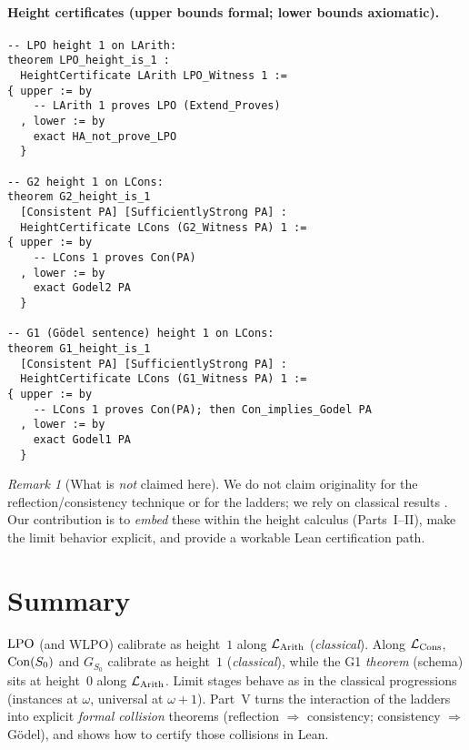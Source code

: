 \documentclass[11pt]{article}
\theoremstyle{definition}
\theoremstyle{remark}
\newtheorem{remark}[theorem]{Remark}
\newcommand{\WLPO}{\mathrm{WLPO}}
\begin{document}
\paragraph{Height certificates (upper bounds formal; lower bounds axiomatic).}
\begin{verbatim}
-- LPO height 1 on LArith:
theorem LPO_height_is_1 :
  HeightCertificate LArith LPO_Witness 1 :=
{ upper := by
    -- LArith 1 proves LPO (Extend_Proves)
  , lower := by
    exact HA_not_prove_LPO
  }

-- G2 height 1 on LCons:
theorem G2_height_is_1
  [Consistent PA] [SufficientlyStrong PA] :
  HeightCertificate LCons (G2_Witness PA) 1 :=
{ upper := by
    -- LCons 1 proves Con(PA)
  , lower := by
    exact Godel2 PA
  }

-- G1 (Gödel sentence) height 1 on LCons:
theorem G1_height_is_1
  [Consistent PA] [SufficientlyStrong PA] :
  HeightCertificate LCons (G1_Witness PA) 1 :=
{ upper := by
    -- LCons 1 proves Con(PA); then Con_implies_Godel PA
  , lower := by
    exact Godel1 PA
  }
\end{verbatim}

\begin{remark}[What is \emph{not} claimed here]
We do not claim originality for the reflection/consistency technique or for the ladders;
we rely on classical results \cite{Turing1939,Feferman1962,HajekPudlak,Beklemishev2003,Beklemishev2004}.
Our contribution is to \emph{embed} these within the height calculus (Parts~I--II),
make the limit behavior explicit, and provide a workable Lean certification path.
\end{remark}

\section{Summary}

\(\mathrm{LPO}\) (and \(\WLPO\)) calibrate as height~\(1\) along \(\mathcal{L}_{\mathrm{Arith}}\) (\emph{classical}).
Along \(\mathcal{L}_{\mathrm{Cons}}\), \(\mathrm{Con}(S_0)\) and \(G_{S_0}\) calibrate as height~\(1\) (\emph{classical}),
while the G1 \emph{theorem} (schema) sits at height~\(0\) along \(\mathcal{L}_{\mathrm{Arith}}\).
Limit stages behave as in the classical progressions (instances at \(\omega\), universal at \(\omega{+}1\)).
Part~V turns the interaction of the ladders into explicit \emph{formal collision} theorems
(reflection \(\Rightarrow\) consistency; consistency \(\Rightarrow\) G\"odel), and shows how to certify
those collisions in Lean.
\end{document}
